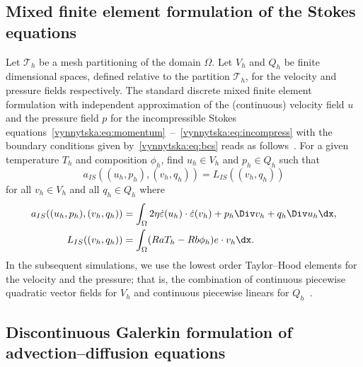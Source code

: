 \subsection{Mixed finite element formulation of the Stokes equations}

Let $\mathcal{T}_h$ be a mesh partitioning of the domain $\Omega$. Let
$V_h$ and $Q_h$ be finite dimensional spaces, defined relative to the
partition $\mathcal{T}_h$, for the velocity and pressure fields
respectively. The standard discrete mixed finite element formulation
with independent approximation of the (continuous) velocity field $u$
and the pressure field $p$ for the incompressible Stokes
equations~\eqref{vynnytska:eq:momentum}~--~\eqref{vynnytska:eq:incompress}
with the boundary conditions given by~\eqref{vynnytska:eq:bcs} reads
as follows~\citep{ZienkiewiczTaylor2000}. For a given temperature
$T_h$ and composition $\phi_h$, find $u_h \in V_h$ and $p_h
\in Q_h$ such that
\begin{equation}
  \label{vynnytska:eq:mixed}
  a_{IS} ( (u_h, p_h), (v_h, q_h) ) = L_{IS} ( (v_h, q_h) )
\end{equation}
for all $v_h \in V_h$ and all $q_h \in Q_h$ where
\begin{align}
  a_{IS} ( (u_h, p_h), (v_h, q_h) )
  & =
  \int_{\Omega} 2 \eta \dot {\varepsilon}(u_h)  \cdot \dot {\varepsilon}(v_h)
  + p_h \Div v_h + q_h \Div u_h \dx, \\
  L_{IS} ( (v_h, q_h) ) &=
  \int_{\Omega} ( Ra T_h - Rb \phi_{h} ) e \cdot v_h  \dx.
\end{align}
In the subsequent simulations, we use the lowest order Taylor--Hood
elements for the velocity and the pressure; that is, the combination
of continuous piecewise quadratic vector fields for $V_h$ and
continuous piecewise linears for $Q_h$~\citep{TaylorHood1973}.

\subsection{Discontinuous Galerkin formulation of advection--diffusion equations}

